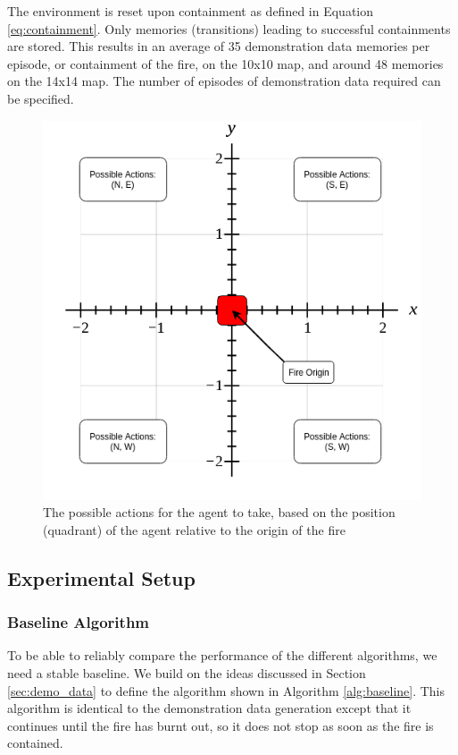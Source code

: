 The environment is reset upon containment as defined in Equation \eqref{eq:containment}. Only memories (transitions) leading to successful containments are stored. This results in an average of 35 demonstration data memories per episode, or containment of the fire, on the 10x10 map, and around 48 memories on the 14x14 map. The number of episodes of demonstration data required can be specified.

\begin{figure}[h]
    \centering
    \includegraphics[width=1\linewidth]{img/Demo-data_Baseline.png}
    \caption{The possible actions for the agent to take, based on the position (quadrant) of the agent relative to the origin of the fire}
    \label{fig:demodata}
\end{figure}



\subsection{Experimental Setup}\label{sec:experiment}

\subsubsection{Baseline Algorithm}\label{sec:baseline}
To be able to reliably compare the performance of the different algorithms, we need a stable baseline. We build on the ideas discussed in Section \ref{sec:demo_data} to define the algorithm shown in Algorithm \ref{alg:baseline}. This algorithm is identical to the demonstration data generation except that it continues until the fire has burnt out, so it does not stop as soon as the fire is contained.

